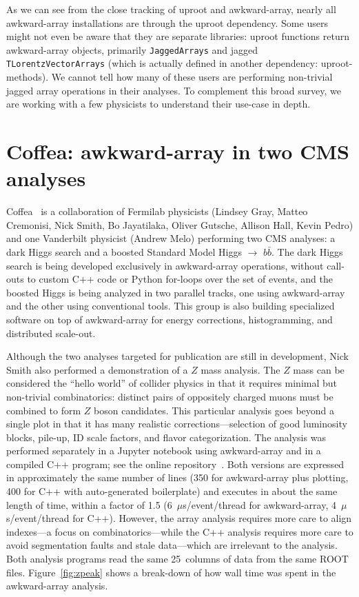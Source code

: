 \documentclass[a4paper]{jpconf}
\begin{document}
As we can see from the close tracking of uproot and awkward-array, nearly all awkward-array installations are through the uproot dependency. Some users might not even be aware that they are separate libraries: uproot functions return awkward-array objects, primarily {\tt JaggedArrays} and jagged {\tt TLorentzVectorArrays} (which is actually defined in another dependency: uproot-methods). We cannot tell how many of these users are performing non-trivial jagged array operations in their analyses. To complement this broad survey, we are working with a few physicists to understand their use-case in depth.

\section{Coffea: awkward-array in two CMS analyses}

Coffea~\cite{coffea} is a collaboration of Fermilab physicists (Lindsey Gray, Matteo Cremonisi, Nick Smith, Bo Jayatilaka, Oliver Gutsche, Allison Hall, Kevin Pedro) and one Vanderbilt physicist (Andrew Melo) performing two CMS analyses: a dark Higgs search and a boosted Standard Model Higgs $\to$ $b\bar{b}$. The dark Higgs search is being developed exclusively in awkward-array operations, without call-outs to custom C++ code or Python for-loops over the set of events, and the boosted Higgs is being analyzed in two parallel tracks, one using awkward-array and the other using conventional tools. This group is also building specialized software on top of awkward-array for energy corrections, histogramming, and distributed scale-out.

Although the two analyses targeted for publication are still in development, Nick Smith also performed a demonstration of a $Z$ mass analysis. The $Z$ mass can be considered the ``hello world'' of collider physics in that it requires minimal but non-trivial combinatorics: distinct pairs of oppositely charged muons must be combined to form $Z$ boson candidates. This particular analysis goes beyond a single plot in that it has many realistic corrections---selection of good luminosity blocks, pile-up, ID scale factors, and flavor categorization. The analysis was performed separately in a Jupyter notebook using awkward-array and in a compiled C++ program; see the online repository~\cite{zpeak}. Both versions are expressed in approximately the same number of lines (350 for awkward-array plus plotting, 400 for C++ with auto-generated boilerplate) and executes in about the same length of time, within a factor of 1.5 (6~$\mu$s/event/thread for awkward-array, 4~$\mu$s/event/thread for C++). However, the array analysis requires more care to align indexes---a focus on combinatorics---while the C++ analysis requires more care to avoid segmentation faults and stale data---which are irrelevant to the analysis. Both analysis programs read the same 25~columns of data from the same ROOT files. Figure~\ref{fig:zpeak} shows a break-down of how wall time was spent in the awkward-array analysis.
\end{document}
